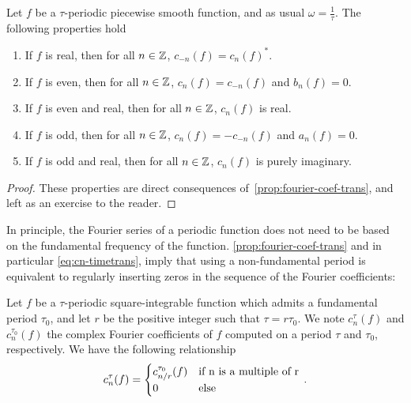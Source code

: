 \begin{proposition}
  Let $f$ be a $\tau$-periodic piecewise smooth function, and as usual
  $\omega=\frac{1}{\tau}$. The following properties hold
  \begin{enumerate}
    \item If $f$ is real, then for all $n\in\mathbb{Z}$, $c_{-n}(f)=c_{n}(f)^*$.
    \item If $f$ is even, then for all $n\in\mathbb{Z}$, $c_{n}(f)=c_{-n}(f)$ and
      $b_n(f)=0$.
    \item If $f$ is even and real, then for all $n\in\mathbb{Z}$, $c_n(f)$ is real.
    \item If $f$ is odd, then for all $n\in\mathbb{Z}$, $c_{n}(f)=-c_{-n}(f)$ and
      $a_n(f)=0$.
    \item If $f$ is odd and real, then for all $n\in\mathbb{Z}$, $c_n(f)$ is purely
      imaginary.
  \end{enumerate}
\end{proposition}
\begin{proof}
  These properties are direct consequences of~\cref{prop:fourier-coef-trans}, and left as
  an exercise to the reader.
\end{proof}
In principle, the Fourier series of a periodic function does not need to be based on the
fundamental frequency of the function. \cref{prop:fourier-coef-trans} and in particular
\cref{eq:cn-timetrans}, imply that using a non-fundamental period is equivalent to
regularly inserting zeros in the sequence of the Fourier coefficients:
\begin{proposition}
  Let $f$ be a $\tau$-periodic square-integrable function which admits a fundamental
  period $\tau_0$, and let $r$ be the positive integer such that $\tau=r\tau_0$. We note
  $c_n^\tau(f)$ and $c_n^{\tau_0}(f)$ the complex Fourier coefficients of $f$ computed on
  a period $\tau$ and $\tau_0$, respectively. We have the following relationship
  \begin{equation}
    c_n^\tau(f)=
    \begin{cases}
      c_{n/r}^{\tau_0}(f)&\text{if}~$n$~\text{is a multiple of}~$r$\\
      0&\text{else}
    \end{cases}\,.
  \end{equation}
\end{proposition}
